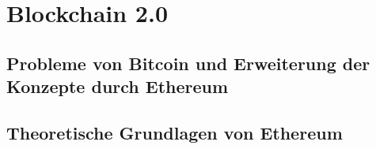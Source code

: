 \chapter{Blockchain 2.0}
\section{Probleme von Bitcoin und Erweiterung der Konzepte durch Ethereum}
\section{Theoretische Grundlagen von Ethereum}